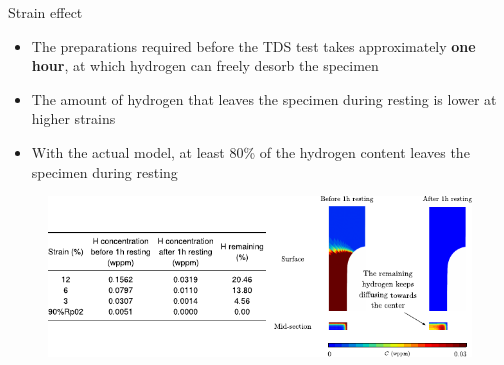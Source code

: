 \documentclass[9pt]{beamer}
\begin{document}
\begin{frame}{Strain effect}

	\begin{itemize}
		\item The preparations required before the TDS test takes approximately \textbf{one hour}, at which hydrogen can freely desorb the specimen
		\vspace{0.15cm}
		\item The amount of hydrogen that leaves the specimen during resting is lower at higher strains
		\vspace{0.15cm}
		\item With the actual model, at least 80\% of the hydrogen content leaves the specimen during resting
	\end{itemize}

	\begin{figure}
		\centering
		\includegraphics[width=\textwidth]{Images/resting_time.pdf} \\
	\end{figure}

\end{frame}


\end{document}
